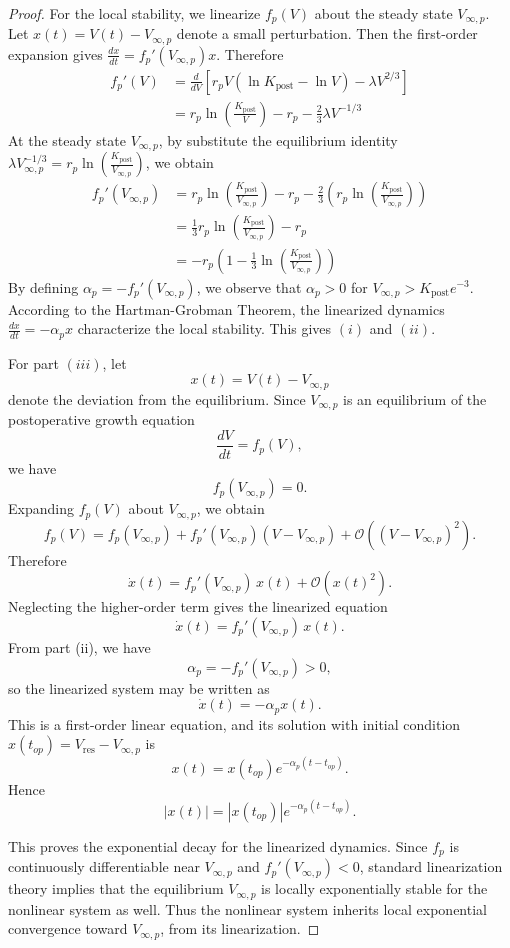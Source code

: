 \documentclass[11pt, reqno]{amsart}
\numberwithin{equation}{section}
\theoremstyle{definition}
\begin{document}
\begin{proof}
For the local stability, we linearize $f_p(V)$ about the steady state $V_{\infty, p}$. Let $x(t) = V(t) - V_{\infty, p}$ denote a small perturbation. Then the first-order expansion gives $\frac{dx}{dt} = f_p'(V_{\infty, p})x$. Therefore
\begin{align*}
f_p'(V) &= \frac{d}{dV} \left[ r_p V (\ln K_{\text{post}} - \ln V) - \lambda V^{2/3} \right] \\
&= r_p \ln \left( \frac{K_{\text{post}}}{V} \right) - r_p - \frac{2}{3} \lambda V^{-1/3}
\end{align*}
At the steady state $V_{\infty, p}$, by substitute the equilibrium identity $\lambda V_{\infty, p}^{-1/3} = r_p \ln\left(\frac{K_{\text{post}}}{V_{\infty, p}}\right)$, we obtain
\begin{align*}
f_p'(V_{\infty, p}) &= r_p \ln\left(\frac{K_{\text{post}}}{V_{\infty, p}}\right) - r_p - \frac{2}{3} \left( r_p \ln\left(\frac{K_{\text{post}}}{V_{\infty, p}}\right) \right) \\
&= \frac{1}{3} r_p \ln\left(\frac{K_{\text{post}}}{V_{\infty, p}}\right) - r_p \\
&= -r_p \left( 1 - \frac{1}{3} \ln \left( \frac{K_{\text{post}}}{V_{\infty, p}} \right) \right)
\end{align*}
By defining $\alpha_p = -f_p'(V_{\infty, p})$, we observe that $\alpha_p > 0$ for $V_{\infty, p} > K_{\text{post}}e^{-3}$. According to the Hartman-Grobman Theorem, the linearized dynamics $\frac{dx}{dt} = -\alpha_p x$ characterize the local stability. This gives $(i)$ and $(ii)$. 

For part $(iii)$, let
\[
x(t)=V(t)-V_{\infty,p}
\]
denote the deviation from the equilibrium. Since $V_{\infty,p}$ is an equilibrium of the postoperative growth equation
\[
\frac{dV}{dt}=f_p(V),
\]
we have
\[
f_p(V_{\infty,p})=0.
\]
Expanding $f_p(V)$ about $V_{\infty,p}$, we obtain
\[
f_p(V)=f_p(V_{\infty,p})+f_p'(V_{\infty,p})(V-V_{\infty,p})+\mathcal O\!\left((V-V_{\infty,p})^2\right).
\]
Therefore
\[
\dot{x}(t)=f_p'(V_{\infty,p})\,x(t)+\mathcal O(x(t)^2).
\]
Neglecting the higher-order term gives the linearized equation
\[
\dot{x}(t)=f_p'(V_{\infty,p})\,x(t).
\]
From part (ii), we have
\[
\alpha_p=-f_p'(V_{\infty,p})>0,
\]
so the linearized system may be written as
\[
\dot{x}(t)=-\alpha_p x(t).
\]
This is a first-order linear equation, and its solution with initial
condition $x(t_{op})=V_{\mathrm{res}}-V_{\infty,p}$ is
\[
x(t)=x(t_{op})e^{-\alpha_p(t-t_{op})}.
\]
Hence
\[
|x(t)|=|x(t_{op})|e^{-\alpha_p(t-t_{op})}.
\]

This proves the exponential decay for the linearized dynamics. Since $f_p$ is continuously differentiable near $V_{\infty,p}$ and $f_p'(V_{\infty,p})<0$, standard linearization theory implies that the equilibrium $V_{\infty,p}$ is locally exponentially stable for the nonlinear system as well. Thus the nonlinear system inherits local exponential convergence toward $V_{\infty,p}$, from its linearization.
\end{proof}
\end{document}
